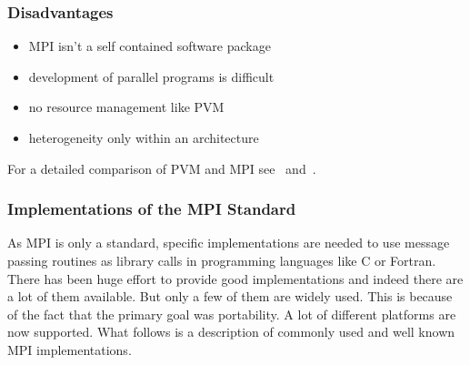 \subsubsection{Disadvantages}
\begin{itemize}
\item MPI isn't a self contained software package
\item development of parallel programs is difficult
\item no resource management like PVM 
\item heterogeneity only within an architecture
\end{itemize}


For a detailed comparison of PVM and MPI see~\cite{geist96pam}
and~\cite{gropp02ggd}.

\subsubsection{Implementations of the MPI Standard}
\label{sec:mpi-implementations}

As MPI is only a standard, specific implementations are needed to use
message passing routines as library calls in programming languages
like C or Fortran. There has been huge effort to provide good
implementations and indeed there are a lot of them available. But
only a few of them are widely used. This is because of the fact that
the primary goal was portability. A lot of different platforms are now
supported. What follows is a description of commonly used and well
known MPI implementations.

